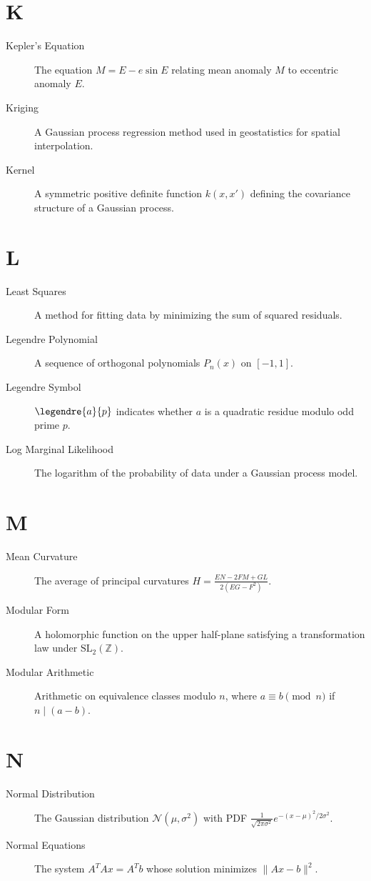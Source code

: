 \section*{K}
\begin{description}
\item[Kepler's Equation] The equation $M = E - e\sin E$ relating mean anomaly $M$ to eccentric anomaly $E$.
\item[Kriging] A Gaussian process regression method used in geostatistics for spatial interpolation.
\item[Kernel] A symmetric positive definite function $k(x,x')$ defining the covariance structure of a Gaussian process.
\end{description}

\section*{L}
\begin{description}
\item[Least Squares] A method for fitting data by minimizing the sum of squared residuals.
\item[Legendre Polynomial] A sequence of orthogonal polynomials $P_n(x)$ on $[-1,1]$.
\item[Legendre Symbol] $\legendre{a}{p}$ indicates whether $a$ is a quadratic residue modulo odd prime $p$.
\item[Log Marginal Likelihood] The logarithm of the probability of data under a Gaussian process model.
\end{description}

\section*{M}
\begin{description}
\item[Mean Curvature] The average of principal curvatures $H = \frac{EN-2FM+GL}{2(EG-F^2)}$.
\item[Modular Form] A holomorphic function on the upper half-plane satisfying a transformation law under $\mathrm{SL}_2(\mathbb{Z})$.
\item[Modular Arithmetic] Arithmetic on equivalence classes modulo $n$, where $a \equiv b \pmod{n}$ if $n \mid (a-b)$.
\end{description}

\section*{N}
\begin{description}
\item[Normal Distribution] The Gaussian distribution $\mathcal{N}(\mu,\sigma^2)$ with PDF $\frac{1}{\sqrt{2\pi\sigma^2}}e^{-(x-\mu)^2/2\sigma^2}$.
\item[Normal Equations] The system $A^TAx = A^Tb$ whose solution minimizes $\|Ax-b\|^2$.
\end{description}


